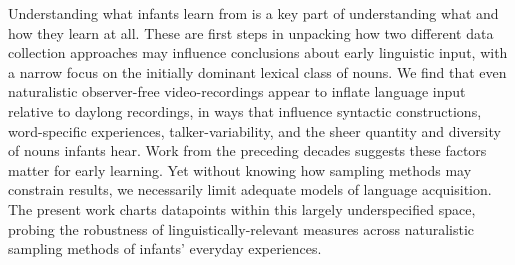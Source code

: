 \documentclass[man]{apa6}
\theoremstyle{definition}
\theoremstyle{definition}
\theoremstyle{definition}
\theoremstyle{remark}
\begin{document}
Understanding what infants learn from is a key part of understanding
what and how they learn at all. These are first steps in unpacking how
two different data collection approaches may influence conclusions about
early linguistic input, with a narrow focus on the initially dominant
lexical class of nouns. We find that even naturalistic observer-free
video-recordings appear to inflate language input relative to daylong
recordings, in ways that influence syntactic constructions,
word-specific experiences, talker-variability, and the sheer quantity
and diversity of nouns infants hear. Work from the preceding decades
suggests these factors matter for early learning. Yet without knowing
how sampling methods may constrain results, we necessarily limit
adequate models of language acquisition. The present work charts
datapoints within this largely underspecified space, probing the
robustness of linguistically-relevant measures across naturalistic
sampling methods of infants' everyday experiences.\newpage
\end{document}
